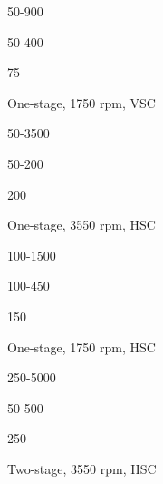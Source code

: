 \documentclass[a4paper,portrait,12pt]{article}
\begin{document}
50-900





50-400





75





\begin{flushleft}
One-stage, 1750 rpm, VSC
\end{flushleft}





50-3500





50-200





200





\begin{flushleft}
One-stage, 3550 rpm, HSC
\end{flushleft}





100-1500





100-450





150





\begin{flushleft}
One-stage, 1750 rpm, HSC
\end{flushleft}





250-5000





50-500





250





\begin{flushleft}
Two-stage, 3550 rpm, HSC
\end{flushleft}
\end{document}
